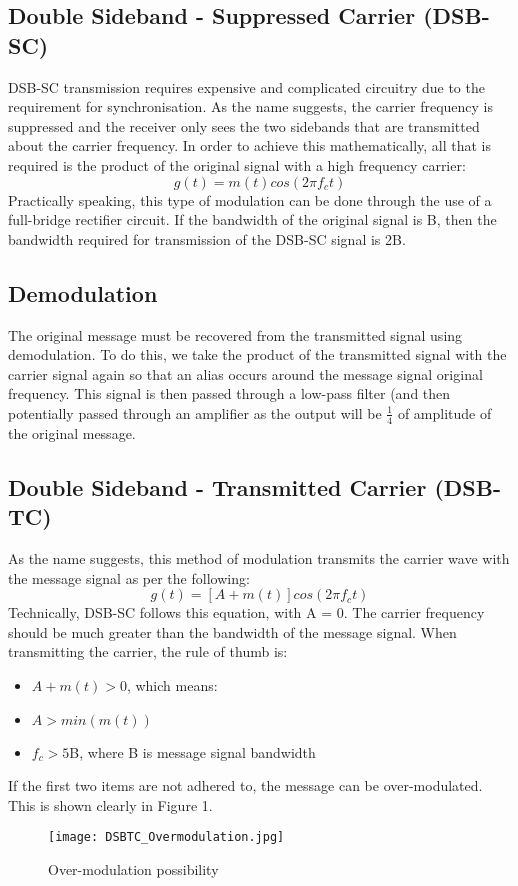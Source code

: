 \documentclass[journal]{IEEEtran}
\begin{document}
\subsection{Double Sideband - Suppressed Carrier (DSB-SC)}
DSB-SC transmission requires expensive and complicated circuitry due to the requirement for synchronisation. As the name suggests, the carrier frequency is suppressed and the receiver only sees the two sidebands that are transmitted about the carrier frequency. In order to achieve this mathematically, all that is required is the product of the original signal with a high frequency carrier:
\[
	g(t) = m(t)cos(2\pi f_ct)
\]
Practically speaking, this type of modulation can be done through the use of a full-bridge rectifier circuit.
\linebreak\linebreak
If the bandwidth of the original signal is B, then the bandwidth required for transmission of the DSB-SC signal is 2B.
\subsection{Demodulation}
The original message must be recovered from the transmitted signal using demodulation. To do this, we take the product of the transmitted signal with the carrier signal again so that an alias occurs around the message signal original frequency. This signal is then passed through a low-pass filter (and then potentially passed through an amplifier as the output will be $\frac{1}{4}$ of amplitude of the original message.
\subsection{Double Sideband - Transmitted Carrier (DSB-TC)}
As the name suggests, this method of modulation transmits the carrier wave with the message signal as per the following:
\[
	g(t) = [A + m(t)]cos(2\pi f_ct)
\]
Technically, DSB-SC follows this equation, with A = 0. The carrier frequency should be much greater than the bandwidth of the message signal. When transmitting the carrier, the rule of thumb is:
\begin{itemize}
	\item $A + m(t) > 0$, which means: 
	\item $A > min(m(t))$
	\item $f_c > 5$B, where B is message signal bandwidth
\end{itemize}
If the first two items are not adhered to, the message can be over-modulated. This is shown clearly in Figure 1.
\begin{figure}[h]
		\hfill\texttt{[image: DSBTC\_Overmodulation.jpg]}\hspace*{\fill}
		\caption{Over-modulation possibility}
	\end{figure}
\end{document}
